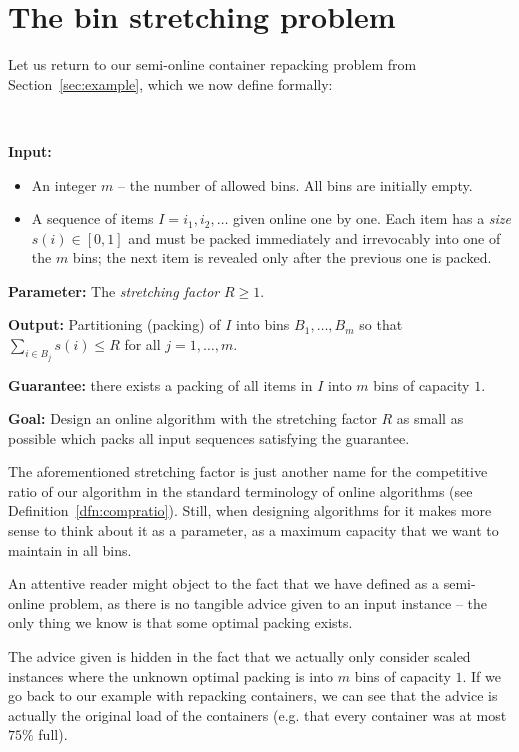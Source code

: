 \section{The bin stretching problem}\label{sec:binstretchdef}

Let us return to our semi-online container repacking problem from
Section~\ref{sec:example}, which we now define formally:

\begin{prb}[\binstretch]~

\noindent\textbf{Input:}

\begin{itemize}
\item An integer $m$ --  the number of allowed bins. All bins are initially empty.
\item A sequence of items $I=i_1, i_2, \ldots$ given online one by one. Each item has
a {\it size} $s(i) \in [0,1]$ and must be packed immediately and irrevocably into one of the $m$ bins; the next item
is revealed only after the previous one is packed.
\end{itemize}

\noindent\textbf{Parameter:} The {\it stretching factor} $R\geq 1$.

\noindent\textbf{Output:} Partitioning (packing) of $I$ into bins $B_1,\ldots,B_m$
so that $\sum_{i\in B_j}s(i)\leq R$ for all $j=1,\ldots,m$.

\noindent\textbf{Guarantee:} there exists a packing of all items in $I$ into $m$
bins of capacity $1$. 

\noindent\textbf{Goal:} Design an online algorithm with the stretching factor $R$
as small as possible which packs all input sequences satisfying the
guarantee.
\end{prb}
\medskip

The aforementioned stretching factor is just another name for the
competitive ratio of our algorithm in the standard terminology of
online algorithms (see Definition~\ref{dfn:compratio}). Still, when
designing algorithms for \binstretch it makes more sense to think
about it as a parameter, as a maximum capacity that we want to
maintain in all bins.

An attentive reader might object to the fact that we have defined
\binstretch as a semi-online problem, as there is no tangible advice
given to an input instance -- the only thing we know is that some
optimal packing exists.

The advice given is hidden in the fact that we actually only consider
scaled instances where the unknown optimal packing is into $m$ bins of
capacity $1$. If we go back to our example with repacking containers,
we can see that the advice is actually the original load of the
containers (e.g. that every container was at most $75\%$ full).

